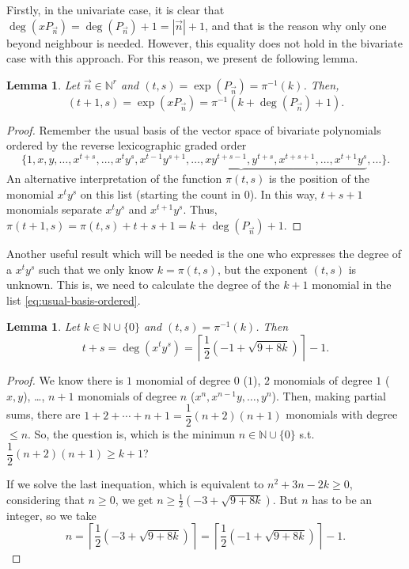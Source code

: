 \documentclass[12pt,a4]{report}
\theoremstyle{plain}
\newtheorem{lemma}[theorem]{Lemma}
\newcommand{\N}[0]{\mathbb{N}}
\begin{document}
    Firstly, in the univariate case, it is clear that $\deg(x P_{\vec n})=\deg(P_{\vec n})+1=|\vec n|+1$, and that is the reason why only one beyond neighbour is needed. However, this equality does not hold in the bivariate case with this approach. For this reason, we present de following lemma.
    
    \begin{lemma}
        \label{lemma:pi-xPn}
        Let $\vec n\in\N^r$ and $(t,s)=\exp(P_{\vec n})=\pi^{-1}(k)$. Then, $$(t+1,s)=\exp(xP_{\vec n})=\pi^{-1}(k+\deg(P_{\vec n})+1).$$
    \end{lemma}
    \begin{proof}
        Remember the usual basis of the vector space of bivariate polynomials ordered by the reverse lexicographic graded order
        $$
        \{1,x,y,\dots, x^{t+s},\dots, \underbrace{x^t y^s, x^{t-1}y^{s+1}, \dots, x y^{t+s-1},y^{t+s},x^{t+s+1},\dots,x^{t+1}y^s},\dots\}.
        $$
        An alternative interpretation of the function $\pi(t,s)$ is the position of the monomial $x^t y^s$ on this list (starting the count in $0$). In this way, $t+s+1$ monomials separate $x^t y^s$ and $x^{t+1} y^s$. Thus, $\pi(t+1,s)=\pi(t,s)+t+s+1 = k + \deg(P_{\vec n}) +1$. 
    \end{proof}

    Another useful result which will be needed is the one who expresses the degree of a  $x^t y^s$ such that we only know $k=\pi(t,s)$, but the exponent $(t,s)$ is unknown. This is, we need to calculate the degree of the $k+1$ monomial in the list \eqref{eq:usual-basis-ordered}.

    \begin{lemma}
        \label{lemma:degree}
        Let $k \in \N\cup\{0\}$ and $(t,s)=\pi^{-1}(k)$. Then 
        \begin{equation}
        t+s =\deg(x^t y^s)= \left\lceil \dfrac{1}{2}(-1+\sqrt{9+8k}) \right\rceil-1.
        \end{equation}
    \end{lemma}
    \begin{proof}
        We know there is $1$ monomial of degree $0$ ($1$), $2$ monomials of degree $1$ ($x, y$), \dots, $n+1$ monomials of degree $n$ ($x^n, x^{n-1}y, \dots, y^n$). Then, making partial sums, there are $1+2+\cdots + n+1=\dfrac{1}{2}(n+2)(n+1)$ monomials with degree $\leq n$. So, the question is, which is the minimun $n\in\N\cup\{0\}$ s.t. $\dfrac{1}{2}(n+2)(n+1)\geq k+1$?

        If we solve the last inequation, which is equivalent to $n^2 + 3n -2k \geq 0$, considering that $n\geq 0$, we get $n\geq \frac 1 2 (-3+\sqrt{9+8k})$. But $n$ has to be an integer, so we take 
        $$
        n=  \left\lceil\frac 1 2 (-3+\sqrt{9+8k})\right\rceil = \left\lceil\frac 1 2 (-1+\sqrt{9+8k})\right\rceil -1.
        $$

    \end{proof}
\end{document}
